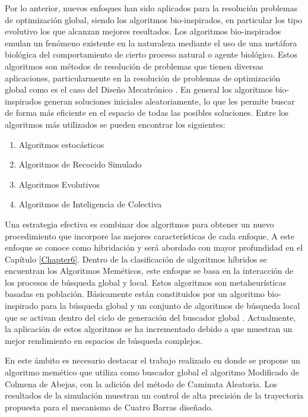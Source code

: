   Por lo anterior, nuevos enfoques han sido aplicados para la resolución problemas de optimización global, siendo los algoritmos bio-inspirados, en particular los tipo evolutivo los que alcanzan mejores resultados. Los algoritmos bio-inspirados emulan un fenómeno existente en la naturaleza mediante el uso de una metáfora biológica del comportamiento de cierto proceso natural o agente biológico. Estos algoritmos son métodos de resolución de problemas que tienen diversas  aplicaciones, particularmente en la resolución de problemas de optimización global como es el caso del Diseño Mecatrónico \cite{yang_swarm_2013}. En general los algoritmos bio-inspirados generan soluciones iniciales aleatoriamente, lo que les permite buscar de forma más eficiente en el espacio de todas las posibles soluciones. Entre los algoritmos más utilizados se pueden encontrar los siguientes:

  \begin{enumerate}
  	\item Algoritmos estocásticos 
  	\item Algoritmos de Recocido Simulado 
  	\item Algoritmos Evolutivos 
  	\item Algoritmos de Inteligencia de Colectiva
  \end{enumerate}

Una estrategia efectiva es combinar dos algoritmos para obtener un nuevo procedimiento que incorpore las mejores características de cada enfoque. A este enfoque se conoce como hibridación y será abordado con mayor profundidad en el Capítulo \ref{Chapter6}. Dentro de la clasificación de algoritmos híbridos se encuentran los Algoritmos Meméticos, este enfoque se basa en la interacción de los procesos de búsqueda global y local. Estos algoritmos son metaheurísticas basadas en población. Básicamente están constituidos por un algoritmo bio-inspirado para la búsqueda global y un conjunto de algoritmos de búsqueda local que se activan dentro del ciclo de generación del buscador global \cite{ferrante_handbook_2012}. Actualmente, la aplicación de estos algoritmos se ha incrementado debido a que muestran un mejor rendimiento en espacios de búsqueda complejos. 

En este ámbito es necesario destacar el trabajo 
realizado en \cite{VegaMEC1} donde se propone un algoritmo memético que utiliza como buscador global el algoritmo Modificado de Colmena de Abejas, con la adición del método de Caminata Aleatoria. Los resultados de la simulación muestran un control de alta precisión de la trayectoria propuesta para el mecanismo de Cuatro Barras diseñado.

